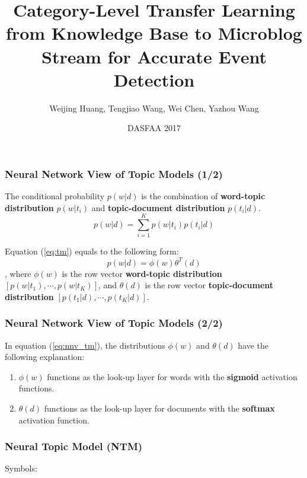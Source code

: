 \documentclass{beamer}
\begin{document}
\title{Category-Level Transfer Learning from Knowledge Base to Microblog Stream for Accurate Event Detection}
\author{Weijing Huang, Tengjiao Wang, Wei Chen, Yazhou Wang}
\date{DASFAA 2017}
\maketitle

\begin{frame}
\frametitle{Neural Network View of Topic Models (1/2)}

The conditional probability \(p(w|d)\) is the combination of \textbf{word-topic distribution} \(p(w|t_i)\) and \textbf{topic-document distribution} \(p(t_i|d)\).
\begin{equation}
\label{eq:tm}
	p(w|d)=\sum_{i=1}^{K} p(w|t_i)p(t_i|d)
\end{equation}

Equation (\ref{eq:tm}) equals to the following form:
\begin{equation}
\label{eq:nnv_tm}
p(w|d)=\phi(w) \theta^T(d)
\end{equation}
, where \(\phi(w)\) is the row vector \textbf{word-topic distribution} \([p(w|t_1), \cdots, p(w|t_K)]\), and \(\theta(d)\) is the row vector \textbf{topic-document distribution} \([p(t_1|d), \cdots, p(t_K|d)]\).

\end{frame}

\begin{frame}
\frametitle{Neural Network View of Topic Models (2/2)}

In equation (\ref{eq:nnv_tm}), the distributions \(\phi(w)\) and \(\theta(d)\) have the following explanation:
\begin{enumerate}
	\item \(\phi(w)\) functions as the look-up layer for words with the \textbf{sigmoid} activation functions.
	\item \(\theta(d)\) functions as the look-up layer for documents with the \textbf{softmax} activation function. 
\end{enumerate}	

\end{frame}

\begin{frame}
\frametitle{Neural Topic Model (NTM)}	
Symbols:

\end{frame}
\end{document}
